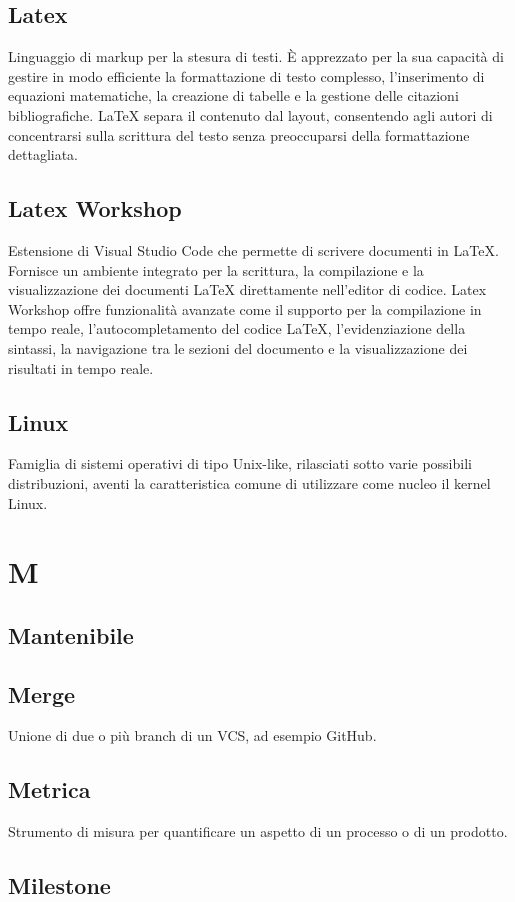\documentclass[12pt]{article}
\begin{document}
		\subsection{Latex}
			Linguaggio di markup per la stesura di testi. È apprezzato per la sua capacità di gestire in modo efficiente la formattazione di testo complesso, l'inserimento di equazioni matematiche, la creazione di tabelle e la gestione delle citazioni bibliografiche. LaTeX separa il contenuto dal layout, consentendo agli autori di concentrarsi sulla scrittura del testo senza preoccuparsi della formattazione dettagliata. 

		\subsection{Latex Workshop}
			Estensione di Visual Studio Code che permette di scrivere documenti in LaTeX. Fornisce un ambiente integrato per la scrittura, la compilazione e la visualizzazione dei documenti LaTeX direttamente nell'editor di codice. Latex Workshop offre funzionalità avanzate come il supporto per la compilazione in tempo reale, l'autocompletamento del codice LaTeX, l'evidenziazione della sintassi, la navigazione tra le sezioni del documento e la visualizzazione dei risultati in tempo reale.
		\subsection{Linux}
			Famiglia di sistemi operativi di tipo Unix-like, rilasciati sotto varie possibili distribuzioni, aventi la caratteristica comune di utilizzare come nucleo il kernel Linux.

	\clearpage
	\section{M}
		\subsection{Mantenibile}
		\subsection{Merge}
			Unione di due o più branch di un VCS, ad esempio GitHub.
		\subsection{Metrica}
			Strumento di misura per quantificare un aspetto di un processo o di un prodotto.
		\subsection{Milestone}
\end{document}
